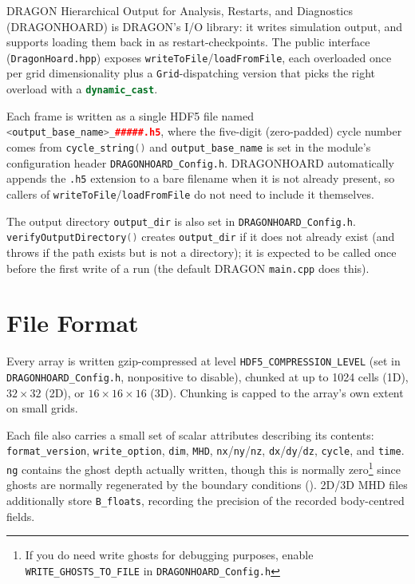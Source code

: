 \documentclass[11pt]{report}
\newcommand{\cpp}[1]{\lstinline[language=C++]{#1}}
\newcommand{\bash}[1]{\lstinline[language=bash]{#1}}
\begin{document}
{DRAGON Hierarchical Output for Analysis, Restarts, and Diagnostics} (DRAGONHOARD) is DRAGON's I/O library: it writes simulation output, and supports loading them back in as restart-checkpoints. The public interface (\bash{DragonHoard.hpp}) exposes \cpp{writeToFile}/\cpp{loadFromFile}, each overloaded once per grid dimensionality plus a \cpp{Grid}-dispatching version that picks the right overload with a \cpp{dynamic_cast}.


Each frame is written as a single HDF5 file named \cpp{<output_base_name>_#####.h5}, where the five-digit (zero-padded) cycle number comes from \cpp{cycle_string()} and
\cpp{output_base_name} is set in the module's configuration header \bash{DRAGONHOARD_Config.h}.   DRAGONHOARD automatically appends the \bash{.h5} extension to a bare filename when it is not already present, so callers of \cpp{writeToFile}/\cpp{loadFromFile} do not need to include it themselves.

The output directory \cpp{output_dir} is also set in \bash{DRAGONHOARD_Config.h}. 
\cpp{verifyOutputDirectory()} creates \cpp{output_dir} if it does not already exist (and throws if the path exists but is not a directory); it is expected to be called once before the first write of a run (the default DRAGON \bash{main.cpp} does this).


\section{File Format}
\label{sec:hoard-format}

Every array is written gzip-compressed at level \cpp{HDF5_COMPRESSION_LEVEL} (set in \bash{DRAGONHOARD_Config.h}, nonpositive to disable), chunked at up to 1024 cells (1D), $32\times32$ (2D), or $16\times16\times16$ (3D). Chunking is capped to the array's own extent on small grids.

Each file also carries a small set of scalar attributes describing its contents: \cpp{format_version}, \cpp{write_option}, \cpp{dim}, \cpp{MHD}, \cpp{nx}/\cpp{ny}/\cpp{nz}, \cpp{dx}/\cpp{dy}/\cpp{dz}, \cpp{cycle}, and \cpp{time}.
 \cpp{ng} contains the ghost depth actually written, though this is normally zero\footnote{If you do need write ghosts for debugging purposes, enable \cpp{WRITE_GHOSTS_TO_FILE} in \bash{DRAGONHOARD_Config.h}} since ghosts are normally regenerated by the boundary conditions (). 
 2D/3D MHD files additionally store \cpp{B_floats}, recording the precision of the recorded body-centred fields.
\end{document}
